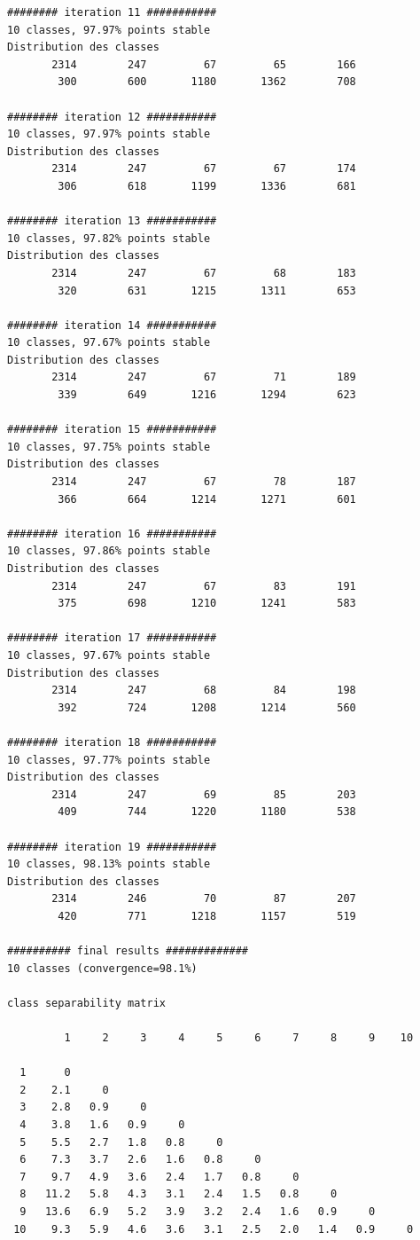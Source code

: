 \documentclass[earth,article,accept,pdftex,moreauthors]{Definitions/mdpi}
\begin{document}
{\begin{scriptsize}
\begin{verbatim}
######## iteration 11 ###########
10 classes, 97.97% points stable
Distribution des classes
       2314        247         67         65        166
        300        600       1180       1362        708

######## iteration 12 ###########
10 classes, 97.97% points stable
Distribution des classes
       2314        247         67         67        174
        306        618       1199       1336        681

######## iteration 13 ###########
10 classes, 97.82% points stable
Distribution des classes
       2314        247         67         68        183
        320        631       1215       1311        653

######## iteration 14 ###########
10 classes, 97.67% points stable
Distribution des classes
       2314        247         67         71        189
        339        649       1216       1294        623

######## iteration 15 ###########
10 classes, 97.75% points stable
Distribution des classes
       2314        247         67         78        187
        366        664       1214       1271        601

######## iteration 16 ###########
10 classes, 97.86% points stable
Distribution des classes
       2314        247         67         83        191
        375        698       1210       1241        583

######## iteration 17 ###########
10 classes, 97.67% points stable
Distribution des classes
       2314        247         68         84        198
        392        724       1208       1214        560

######## iteration 18 ###########
10 classes, 97.77% points stable
Distribution des classes
       2314        247         69         85        203
        409        744       1220       1180        538

######## iteration 19 ###########
10 classes, 98.13% points stable
Distribution des classes
       2314        246         70         87        207
        420        771       1218       1157        519

########## final results #############
10 classes (convergence=98.1%)

class separability matrix

         1     2     3     4     5     6     7     8     9    10

  1      0
  2    2.1     0
  3    2.8   0.9     0
  4    3.8   1.6   0.9     0
  5    5.5   2.7   1.8   0.8     0
  6    7.3   3.7   2.6   1.6   0.8     0
  7    9.7   4.9   3.6   2.4   1.7   0.8     0
  8   11.2   5.8   4.3   3.1   2.4   1.5   0.8     0
  9   13.6   6.9   5.2   3.9   3.2   2.4   1.6   0.9     0
 10    9.3   5.9   4.6   3.6   3.1   2.5   2.0   1.4   0.9     0


\end{verbatim}
\end{scriptsize}}
\end{document}
